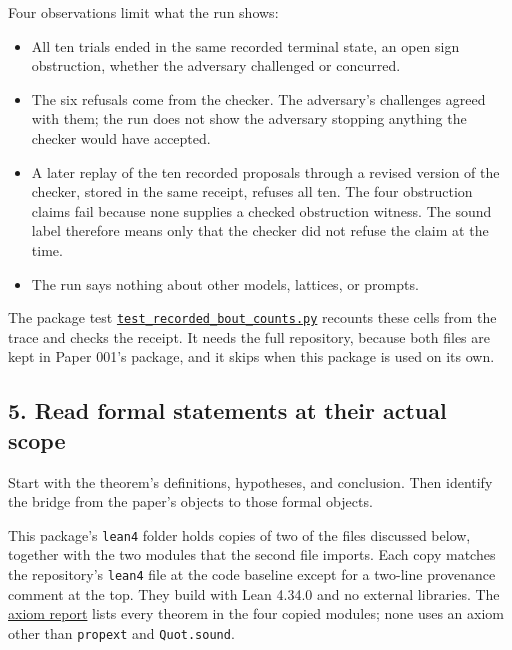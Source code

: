 \documentclass[
  11pt,
]{article}
\newcommand{\passthrough}[1]{#1}
\providecommand{\tightlist}{%
  \setlength{\itemsep}{0pt}\setlength{\parskip}{0pt}}
\begin{document}
Four observations limit what the run shows:

\begin{itemize}
\tightlist
\item
  All ten trials ended in the same recorded terminal state, an open sign
  obstruction, whether the adversary challenged or concurred.
\item
  The six refusals come from the checker. The adversary's challenges
  agreed with them; the run does not show the adversary stopping
  anything the checker would have accepted.
\item
  A later replay of the ten recorded proposals through a revised version
  of the checker, stored in the same receipt, refuses all ten. The four
  obstruction claims fail because none supplies a checked obstruction
  witness. The sound label therefore means only that the checker did not
  refuse the claim at the time.
\item
  The run says nothing about other models, lattices, or prompts.
\end{itemize}

The package test
\href{https://github.com/dbccpage/the_symbol_game/blob/52cb5457f6c485ba548cfd292f6012a941ed22cf/atlas/coda_atlas/symbol_game/009_pfp_adversarial_dialectics_and_terminal_reality_gates/code/tests/test_recorded_bout_counts.py}{\nolinkurl{test_recorded_bout_counts.py}}
recounts these cells from the trace and checks the receipt. It needs the
full repository, because both files are kept in Paper 001's package, and
it skips when this package is used on its own.

\subsection{5. Read formal statements at their actual
scope}\label{read-formal-statements-at-their-actual-scope}

Start with the theorem's definitions, hypotheses, and conclusion. Then
identify the bridge from the paper's objects to those formal objects.

This package's \passthrough{\lstinline!lean4!} folder holds copies of
two of the files discussed below, together with the two modules that the
second file imports. Each copy matches the repository's
\passthrough{\lstinline!lean4!} file at the code baseline except for a
two-line provenance comment at the top. They build with Lean 4.34.0 and
no external libraries. The
\href{https://github.com/dbccpage/the_symbol_game/blob/52cb5457f6c485ba548cfd292f6012a941ed22cf/atlas/coda_atlas/symbol_game/009_pfp_adversarial_dialectics_and_terminal_reality_gates/lean4/axiom_report.txt}{axiom
report} lists every theorem in the four copied modules; none uses an
axiom other than \passthrough{\lstinline!propext!} and
\passthrough{\lstinline!Quot.sound!}.
\end{document}
